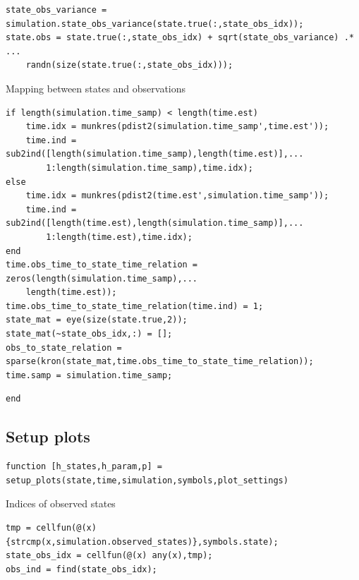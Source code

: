 \color{RoyalPurple}\begin{verbatim}
state_obs_variance = simulation.state_obs_variance(state.true(:,state_obs_idx));
state.obs = state.true(:,state_obs_idx) + sqrt(state_obs_variance) .* ...
    randn(size(state.true(:,state_obs_idx)));
\end{verbatim}
\color{black}
\begin{par}
Mapping between states and observations
\end{par} \vspace{1em}
\color{RoyalPurple}\begin{verbatim}
if length(simulation.time_samp) < length(time.est)
    time.idx = munkres(pdist2(simulation.time_samp',time.est'));
    time.ind = sub2ind([length(simulation.time_samp),length(time.est)],...
        1:length(simulation.time_samp),time.idx);
else
    time.idx = munkres(pdist2(time.est',simulation.time_samp'));
    time.ind = sub2ind([length(time.est),length(simulation.time_samp)],...
        1:length(time.est),time.idx);
end
time.obs_time_to_state_time_relation = zeros(length(simulation.time_samp),...
    length(time.est));
time.obs_time_to_state_time_relation(time.ind) = 1;
state_mat = eye(size(state.true,2));
state_mat(~state_obs_idx,:) = [];
obs_to_state_relation = sparse(kron(state_mat,time.obs_time_to_state_time_relation));
time.samp = simulation.time_samp;
\end{verbatim}
\color{black}
\color{RoyalPurple}\begin{verbatim}
end
\end{verbatim}
\color{black}
\begin{par}
\section{ Setup plots }
\end{par} \vspace{1em}
\color{RoyalPurple}\begin{verbatim}
function [h_states,h_param,p] = setup_plots(state,time,simulation,symbols,plot_settings)
\end{verbatim}
\color{black}
\begin{par}
Indices of observed states
\end{par} \vspace{1em}
\color{RoyalPurple}\begin{verbatim}
tmp = cellfun(@(x) {strcmp(x,simulation.observed_states)},symbols.state);
state_obs_idx = cellfun(@(x) any(x),tmp);
obs_ind = find(state_obs_idx);
\end{verbatim}
